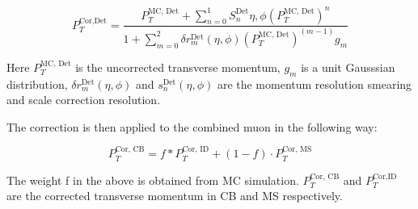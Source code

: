
\begin{equation}
    P_{T}^{\textrm{Cor,Det}} = \frac{P^{\textrm{MC, Det}}_{T} + \sum_{n=0}^{1} S_{n}^{\textrm{Det}}{\eta, \phi}(P_{T}^\textrm{{MC, Det}})^n}{1+\sum_{m=0}^{2}\delta r_{m}^{\textrm{Det}}(\eta, \phi)(P_{T}^{\textrm{MC, Det}})^(m-1) g_{m}}
\label{eq:muoncalib}
\end{equation}

Here $P_{T}^{\textrm{MC, Det}}$ is the uncorrected transverse momentum, $g_m$ is a unit Gausssian distribution, $\delta r^{\textrm{Det}}_{m}(\eta, \phi)$ and $s_{n}^{\textrm{Det}}(\eta, \phi)$ are the momentum resolution smearing and scale correction resolution. 

The correction is then applied to the combined muon in the following way:

\begin{equation}
    P_{T}^{\textrm{Cor, CB}} = f *P_{T}^{\textrm{Cor, ID}}+ (1-f) \cdot P_{T}^{\textrm{Cor, MS}}
\label{eq:muoncalibfactor}
\end{equation}

The weight f in the above is obtained from MC simulation. $P_T^{\textrm{Cor, CB}}$ and $P_T^{\textrm{Cor,ID}}$ are the corrected transverse momentum in CB and MS respectively.





%
%
%
%
%
%

